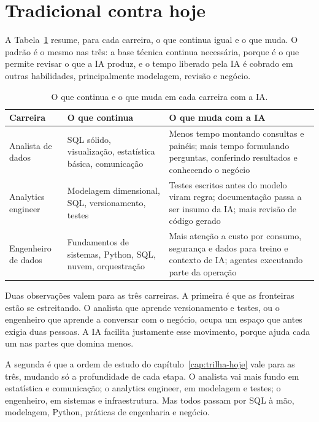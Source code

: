 \section{Tradicional contra hoje}
\label{sec:comparativo-trilhas}

A Tabela~\ref{tab:comparativo-trilhas} resume, para cada carreira, o que continua igual e o
que muda. O padrão é o mesmo nas três: a base técnica continua necessária, porque é o que
permite revisar o que a IA produz, e o tempo liberado pela IA é cobrado em outras
habilidades, principalmente modelagem, revisão e negócio.

\begin{table}[htbp]
  \centering
  \caption{O que continua e o que muda em cada carreira com a IA.}
  \label{tab:comparativo-trilhas}
  \small
  \begin{tabularx}{\textwidth}{@{}>{\raggedright\arraybackslash}p{}
      >{\raggedright\arraybackslash}X>{\raggedright\arraybackslash}X@{}}
    \toprule
    Carreira & O que continua & O que muda com a IA \\
    \midrule
    Analista de dados & SQL sólido, visualização, estatística básica, comunicação &
      Menos tempo montando consultas e painéis; mais tempo formulando perguntas,
      conferindo resultados e conhecendo o negócio \\
    \addlinespace
    Analytics engineer & Modelagem dimensional, SQL, versionamento, testes &
      Testes escritos antes do modelo viram regra; documentação passa a ser insumo da IA;
      mais revisão de código gerado \\
    \addlinespace
    Engenheiro de dados & Fundamentos de sistemas, Python, SQL, nuvem, orquestração &
      Mais atenção a custo por consumo, segurança e dados para treino e contexto de IA;
      agentes executando parte da operação \\
    \bottomrule
  \end{tabularx}
\end{table}

Duas observações valem para as três carreiras. A primeira é que as fronteiras estão se
estreitando. O analista que aprende versionamento e testes, ou o engenheiro que aprende a
conversar com o negócio, ocupa um espaço que antes exigia duas pessoas. A IA facilita
justamente esse movimento, porque ajuda cada um nas partes que domina menos.

A segunda é que a ordem de estudo do capítulo~\ref{cap:trilha-hoje} vale para as três,
mudando só a profundidade de cada etapa. O analista vai mais fundo em estatística e
comunicação; o analytics engineer, em modelagem e testes; o engenheiro, em sistemas e
infraestrutura. Mas todos passam por SQL à mão, modelagem, Python, práticas de engenharia e
negócio.

